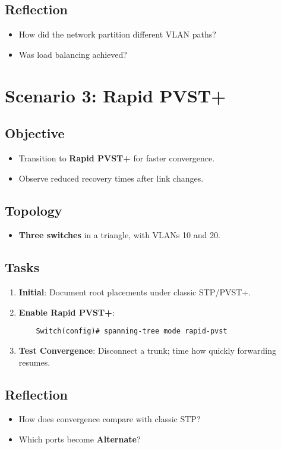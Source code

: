 \documentclass[a4paper]{report}
\begin{document}
\subsection{Reflection}
\begin{itemize}
    \item How did the network partition different VLAN paths?
    \item Was load balancing achieved?
\end{itemize}

\section{Scenario 3: Rapid PVST+}
\subsection{Objective}
\begin{itemize}
    \item Transition to \textbf{Rapid PVST+} for faster convergence.
    \item Observe reduced recovery times after link changes.
\end{itemize}

\subsection{Topology}
\begin{itemize}
    \item \textbf{Three switches} in a triangle, with VLANs 10 and 20.
\end{itemize}

\subsection{Tasks}
\begin{enumerate}
    \item \textbf{Initial}: Document root placements under classic STP/PVST+.
    \item \textbf{Enable Rapid PVST+}:
    \begin{lstlisting}
    Switch(config)# spanning-tree mode rapid-pvst
    \end{lstlisting}
    \item \textbf{Test Convergence}: Disconnect a trunk; time how quickly forwarding resumes.
\end{enumerate}

\subsection{Reflection}
\begin{itemize}
    \item How does convergence compare with classic STP?
    \item Which ports become \textbf{Alternate}?
\end{itemize}
\end{document}
